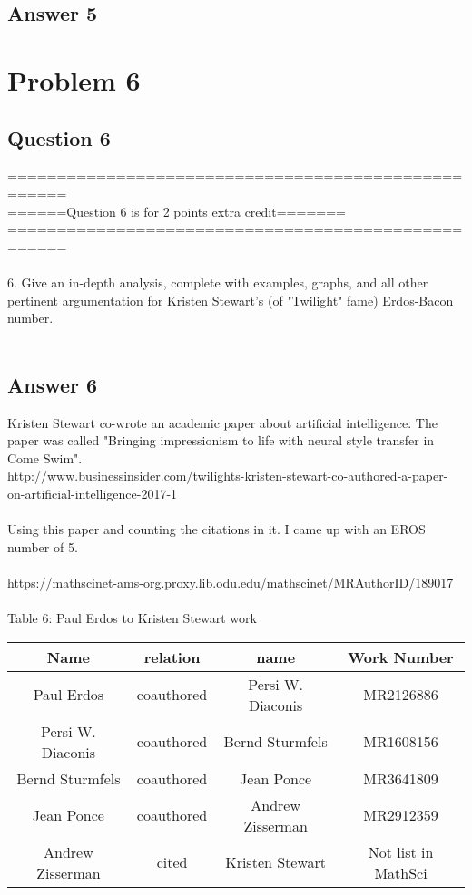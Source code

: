 \documentclass[10pt,letterpaper]{article}
\begin{document}
\subsection{Answer 5}

\pagebreak
\section{Problem 6}
\subsection{Question 6}
====================================================\\
======Question 6 is for 2 points extra credit=======\\
====================================================\\
\\
6.  Give an in-depth analysis, complete with examples, 
graphs, and all other pertinent argumentation for 
Kristen Stewart's (of "Twilight" fame) Erdos-Bacon number.\\
\\
\subsection{Answer 6}

Kristen Stewart co-wrote an academic paper about artificial intelligence.  The paper was called "Bringing impressionism to life with neural style transfer in Come Swim".\\
{http://www.businessinsider.com/twilights-kristen-stewart-co-authored-a-paper-on-artificial-intelligence-2017-1} \\
\\
Using this paper and counting the citations in it.  I came up with an EROS number of 5.\\
\\
https://mathscinet-ams-org.proxy.lib.odu.edu/mathscinet/MRAuthorID/189017\\ 
\\
Table 6: Paul Erdos to Kristen Stewart work
\begin{center}
  \begin{tabular}{ | c | c | c | c}
    \hline
      Name & relation & name & Work Number\\ \hline
      Paul Erdos & coauthored & Persi W. Diaconis & MR2126886 \\ \hline 
      Persi W. Diaconis & coauthored & Bernd Sturmfels & MR1608156\\ \hline 
      Bernd Sturmfels & coauthored & Jean Ponce & MR3641809\\ \hline 
      Jean Ponce & coauthored & Andrew Zisserman & MR2912359\\ \hline 
      Andrew Zisserman & cited & Kristen Stewart &  Not list in MathSci\\ \hline 
    \hline
  \end{tabular}
\end{center}
\end{document}
